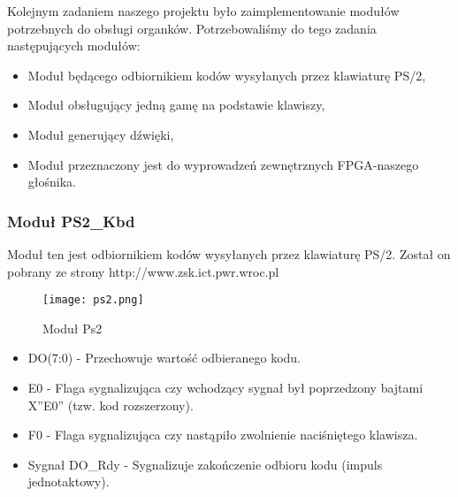 \documentclass[11pt]{report}
\begin{document}
	Kolejnym zadaniem naszego projektu było zaimplementowanie modułów potrzebnych do obsługi organków. Potrzebowaliśmy do tego zadania następujących modułów:
	
		\begin{itemize}
    	    \item Moduł będącego odbiornikiem kodów wysyłanych przez klawiaturę PS/2,
        	\item Moduł obsługujący jedną gamę na podstawie klawiszy,
    	    \item Moduł generujący dźwięki,
    	    \item Moduł przeznaczony jest do wyprowadzeń zewnętrznych FPGA-naszego głośnika.
       	\end{itemize}
	
\subsubsection{Moduł PS2\_Kbd}

\par Moduł ten jest odbiornikiem kodów wysyłanych przez klawiaturę PS/2. Został on pobrany ze strony http://www.zsk.ict.pwr.wroc.pl

    \begin{figure}[h]
    	\centering
    	\texttt{[image: ps2.png]}
    	\caption{Moduł Ps2}
	    \label{fig:ps2}
    \end{figure}

    \begin{itemize}
		\item DO(7:0) - Przechowuje wartość odbieranego kodu.
	    \item E0 - Flaga sygnalizująca czy wchodzący sygnał był poprzedzony bajtami X”E0” (tzw. kod rozszerzony).
	    \item F0 - Flaga sygnalizująca czy nastąpiło zwolnienie naciśniętego klawisza.
	    \item Sygnał DO\_Rdy - Sygnalizuje zakończenie odbioru kodu (impuls jednotaktowy).
	\end{itemize}
	
\newpage
\end{document}
